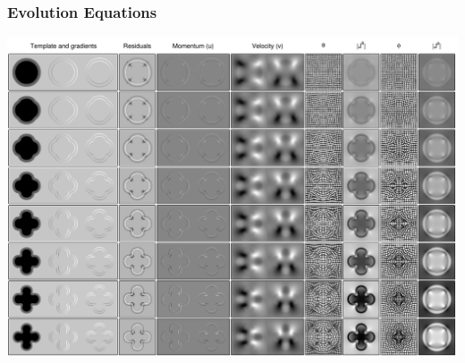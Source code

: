 \documentclass{beamer}
\begin{document}
\begin{frame}
\frametitle{Evolution Equations}
\begin{center}
\includegraphics[width=.9\textwidth]{evolution}
\end{center}
\end{frame}






\end{document}
